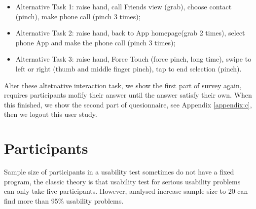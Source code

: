 \begin{itemize}
    \kaishu
    \item Alternative Task 1: raise hand, call Friends view (grab), choose contact (pinch), make phone call (pinch 3 times);
    \item Alternative Task 2: raise hand, back to App homepage(grab 2 times), select phone App and make the phone call (pinch 3 times);
    \item Alternative Task 3: raise hand, Force Touch (force pinch, long time), swipe to left or right (thumb and middle finger pinch), tap to end selection (pinch).
\end{itemize}

Alter these altetnative interaction task, we show the first part of survey again, requires participants mofify their answer until the answer satisfy their own. When this finished, we show the second part of quesionnaire, see Appendix \ref{appendix:c}, then we logout this user study.

\section{Participants}

Sample size of participants in a usability test sometimes do not have a fixed program, the classic theory is that usability test for serious usability problems can only take five participants\cite{albert2013measuring}. However, \cite{faulkerner} analysed increase sample size to 20 can find more than 95\% usability problems.

